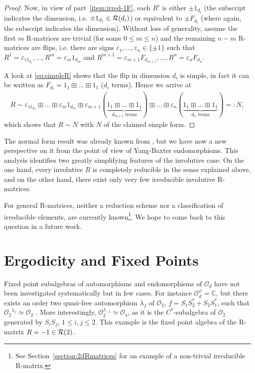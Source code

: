 \documentclass[12pt,a4paper]{amsart}
\numberwithin{equation}{section}
\theoremstyle{remark}
\newcommand{\eps}{\varepsilon}
\newcommand{\CO}[0]{\mathcal{O}} \newcommand{\CP}[0]{\mathcal{P}}
\begin{document}
\begin{proof}
    Now, in view of part~\ref{item:irred-1F}, each $R^i$ is either $\pm1_{d_i}$ (the subscript indicates the dimension, i.e. $\pm1_{d_i}\in\mathcal{R}(d_i)$) or equivalent to $\pm F_{d_i}$ (where again, the subscript indicates the dimension). Without loss of generality, assume the first $m$ R-matrices are trivial (for some $0\leq m\leq n$) and the remaining $n-m$ R-matrices are flips, i.e. there are signs $\eps_1,\ldots,\eps_n\in\{\pm1\}$ such that $R^1=\eps_11_{d_1},\ldots,R^m=\eps_m1_{d_m}$ and $R^{m+1}=\eps_{m+1}F_{d_{m+1}},\ldots,R^n=\eps_n F_{d_n}$.
    
    A look at \eqref{eq:simpleR} shows that the flip in dimension $d_i$ is simple, in fact it can be written as $F_{d_i}=1_1\boxplus\ldots\boxplus1_1$ ($d_i$ terms). 
    Hence we arrive at 
    \begin{align*}
        R \sim \eps_11_{d_1}\boxplus\ldots\boxplus\eps_m1_{d_m}\boxplus
        \eps_{m+1}
        (\underbrace{1_1\boxplus\ldots\boxplus1_1}_{d_{m+1} \text{ terms}})\boxplus\ldots\boxplus
        \eps_n(\underbrace{1_1\boxplus\ldots\boxplus1_1}_{d_n \text{ terms}})=:N,
    \end{align*}
    which shows that $R\sim N$ with $N$ of the claimed simple form.
\end{proof}

The normal form result was already known from \cite{LechnerPennigWood:2019}, but we have now a new perspective on it from the point of view of Yang-Baxter endomorphisms. This analysis identifies two greatly simplifying features of the involutive case: On the one hand, every involutive $R$ is completely reducible in the sense explained above, and on the other hand, there exist only very few irreducible involutive R-matrices.

For general R-matrices, neither a reduction scheme nor a classification of irreducible elements, are currently known\footnote{See Section~\ref{section:2dRmatrices} for an example of a non-trivial irreducible R-matrix.}. We hope to come back to this question in a future work.


\section{Ergodicity and Fixed Points}\label{section:ergodicity}

Fixed point subalgebras of automorphisms and endomorphisms of $\CO_d$ have not been investigated systematically but in few cases. For instance $\CO_d^\varphi = {\mathbb C}$, but  there exists an order two quasi-free automorphism $\lambda_f$ of $\CO_2$, $f=S_1 S_2^* + S_2 S_1^*$, such that ${\CO_2}^{\lambda_f} \simeq \CO_2$ \cite{ChoiLatremoliere:2012}. More interestingly, $\CO_2^{\lambda_{-1}} \simeq \CO_4$, as it is the $C^*$-subalgebra of $\CO_2$ generated by $S_i S_j$, $1 \leq i,j \leq 2$. This example is the fixed point algebra of the R-matrix $R=-1 \in \mathcal{R}(2)$. 
\end{document}
